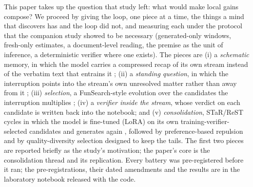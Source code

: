 \documentclass[11pt]{article}
\begin{document}
This paper takes up the question that study left: what would make local
gains compose? We proceed by giving the loop, one piece at a time, the
things a mind that discovers has and the loop did not, and measuring each
under the protocol that the companion study showed to be necessary
(generated-only windows, fresh-only estimates, a document-level reading, the
premise as the unit of inference, a deterministic verifier where one
exists). The pieces are (i) a \emph{schematic} memory, in which the model
carries a compressed recap of its own stream instead of the verbatim text
that entrains it \citep{bartlett1932remembering}; (ii) a \emph{standing
question}, in which the interruption points into the stream's own
unresolved matter rather than away from it \citep{zeigarnik1927behalten};
(iii) \emph{selection}, a FunSearch-style evolution over the candidates the
interruption multiplies \citep{romeraparedes2024funsearch}; (iv) a
\emph{verifier inside the stream}, whose verdict on each candidate is
written back into the notebook; and (v) \emph{consolidation}, STaR/ReST
cycles in which the model is fine-tuned (LoRA) on its own
training-verifier-selected candidates
and generates again \citep{zelikman2022star,gulcehre2023rest,singh2023restem},
followed by preference-based repulsion \citep{rafailov2023dpo} and by
quality-diversity selection \citep{mouret2015mapelites,lehman2011novelty}
designed to keep the tails. The first two pieces are reported briefly as
the study's motivation; the paper's core is the consolidation thread and
its replication. Every battery was pre-registered before it ran;
the pre-registrations, their dated amendments and the results are in the
laboratory notebook released with the code.
\end{document}
